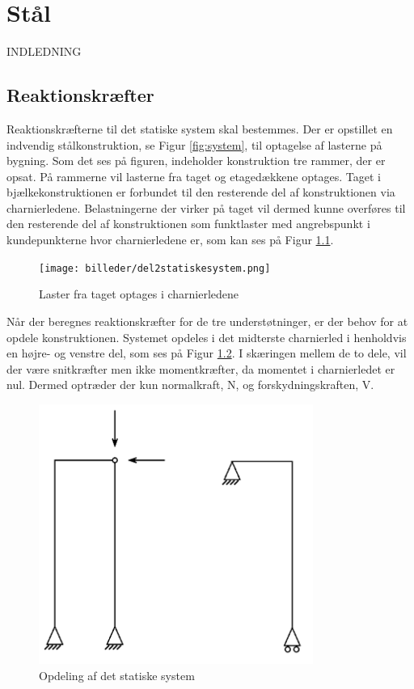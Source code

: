 \chapter{Stål}
INDLEDNING

\section{Reaktionskræfter}
Reaktionskræfterne til det statiske system skal bestemmes. Der er opstillet en indvendig stålkonstruktion, se Figur \ref{fig:system}, til optagelse af lasterne på bygning. Som det ses på figuren, indeholder konstruktion tre rammer, der er opsat. På rammerne vil lasterne fra taget og etagedækkene optages. Taget i bjælkekonstruktionen er forbundet til den resterende del af konstruktionen via charnierledene. Belastningerne der virker på taget vil dermed kunne overføres til den resterende del af konstruktionen som funktlaster med angrebspunkt i kundepunkterne hvor charnierledene er, som kan ses på Figur \ref{fig:del2}. 

\begin{figure}[htbp]
	\centering
	\texttt{[image: billeder/del2statiskesystem.png]}
	\caption{Laster fra taget optages i charnierledene}
	\label{fig:del2}
\end{figure}

Når der beregnes reaktionskræfter for de tre understøtninger, er der behov for at opdele konstruktionen. Systemet opdeles i det midterste charnierled i henholdvis en højre- og venstre del, som ses på Figur \ref{fig:opdeling}. I skæringen mellem de to dele, vil der være snitkræfter men ikke momentkræfter, da momentet i charnierledet er nul. Dermed optræder der kun normalkraft, N, og forskydningskraften, V.

\begin{figure}[htbp]
	\centering
	\includegraphics[width=0.8\textwidth]{billeder/systemopdeling.png}
	\caption{Opdeling af det statiske system}
	\label{fig:opdeling}
\end{figure}
 
